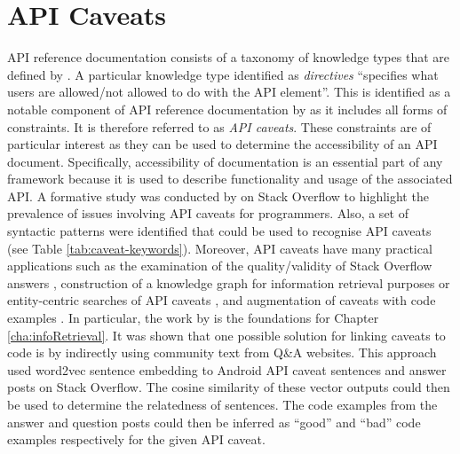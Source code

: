 \section{API Caveats}
\label{sec:related-api-caveats}
API reference documentation consists of a taxonomy of knowledge types that are defined by \cite{maalej2013patterns}. A particular knowledge type identified as \textit{directives} ``specifies what users are allowed/not allowed to do with the API element''. This is identified as a notable component of API reference documentation by \cite{caveat-knowledge-graph} as it includes all forms of constraints. It is therefore referred to as \textit{API caveats}. These constraints are of particular interest as they can be used to determine the accessibility of an API document. Specifically, accessibility of documentation is an essential part of any framework because it is used to describe functionality and usage of the associated API. A formative study was conducted by \citeauthor{caveat-knowledge-graph} on Stack Overflow to highlight the prevalence of issues involving API caveats for programmers. Also, a set of syntactic patterns were identified that could be used to recognise API caveats (see Table \ref{tab:caveat-keywords}). Moreover, API caveats have many practical applications such as the examination of the quality/validity of Stack Overflow answers \cite{xiaoxue}, construction of a knowledge graph for information retrieval purposes or entity-centric searches of API caveats \cite{construct-knowledge-graph}, and augmentation of caveats with code examples \cite{jiamou}. In particular, the work by \cite{jiamou} is the foundations for Chapter \ref{cha:infoRetrieval}. It was shown that one possible solution for linking caveats to code is by indirectly using community text from Q\&A websites. This approach used word2vec sentence embedding to Android API caveat sentences and answer posts on Stack Overflow. The cosine similarity of these vector outputs could then be used to determine the relatedness of sentences. The code examples from the answer and question posts could then be inferred as ``good'' and ``bad'' code examples respectively for the given API caveat. 


